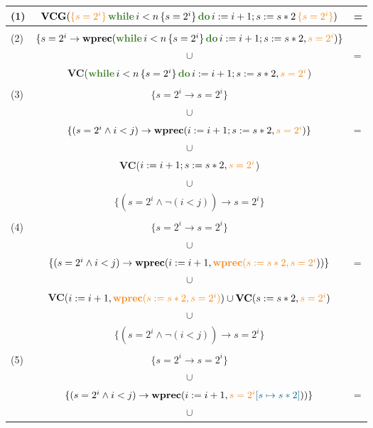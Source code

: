 \documentclass[11pt]{article}
\newcommand{\kw}[1]{{\color{OliveGreen}{#1}}}
\newcommand{\horange}[1]{{\color{BurntOrange}{#1}}}
\newcommand{\hblue}[1]{{\color{MidnightBlue}{#1}}}
\newcommand{\hoaret}[3]{{\color{BurntOrange}{\{#1\}}}\,#2\,{\color{BurntOrange}{\{#3\}}}}
\begin{document}
\begin{tabular}{lcl}
  (1) & $\textbf{VCG}(\hoaret{s = 2^i}{\textbf{\kw{while}}\,i<n\,\{s = 2^i\}\,\textbf{\kw{do}}\,i := i +1 ;s := s*2}{s = 2^i})$ & =\\[2ex]\hline\\
  \multirow{2}{*}{(2)} & $\{s = 2^i \to \textbf{wprec}(\textbf{\kw{while}}\,i<n\,\{s = 2^i\}\,\textbf{\kw{do}}\,i := i +1 ;s := s*2,\horange{s = 2^i})\}$ \\
  & \multicolumn{1}{c}{$\cup$} & =\\
  & \textbf{VC}($\textbf{\kw{while}}\,i<n\,\{s = 2^i\}\,\textbf{\kw{do}}\,i := i +1 ;s := s*2,\horange{s = 2^i}$) \\[2ex]\hline\\
  \multirow{7}{*}{(3)} & $\{s = 2^i \to s = 2^i\}$ \\
  & \multicolumn{1}{c}{$\cup$} \\
  & $\{(s = 2^i \land i < j) \to \textbf{wprec}(i := i + 1;s := s*2,\horange{s = 2^i})\}$ & =\\
  & \multicolumn{1}{c}{$\cup$} \\
  & \textbf{VC}($i := i + 1;s := s*2,\horange{s = 2^i}$) \\
  & \multicolumn{1}{c}{$\cup$} \\
  & $\{(s = 2^i \land \neg(i < j)) \to s = 2^i\}$ \\[2ex]\hline\\  
  \multirow{7}{*}{(4)} & $\{s = 2^i \to s = 2^i\}$ \\
  & \multicolumn{1}{c}{$\cup$} \\
  & $\{(s = 2^i \land i < j) \to \textbf{wprec}(i := i + 1,\horange{\textbf{wprec}(s := s*2,s = 2^i}))\}$ & =\\
  & \multicolumn{1}{c}{$\cup$} \\
  & \textbf{VC}($i := i + 1,\horange{\textbf{wprec}(s := s*2,s = 2^i)}) \cup \textbf{VC}(s := s*2,\horange{s = 2^i})$ \\
  & \multicolumn{1}{c}{$\cup$} \\
  & $\{(s = 2^i \land \neg(i < j)) \to s = 2^i\}$ \\[2ex]\hline\\
  \multirow{7}{*}{(5)} & $\{s = 2^i \to s = 2^i\}$ \\
  & \multicolumn{1}{c}{$\cup$} \\
  & $\{(s = 2^i \land i < j) \to \textbf{wprec}(i := i + 1,\horange{s = 2^i\hblue{[s \mapsto s*2]}}))\}$ & =\\
  & \multicolumn{1}{c}{$\cup$} \\

\end{tabular}
\end{document}
